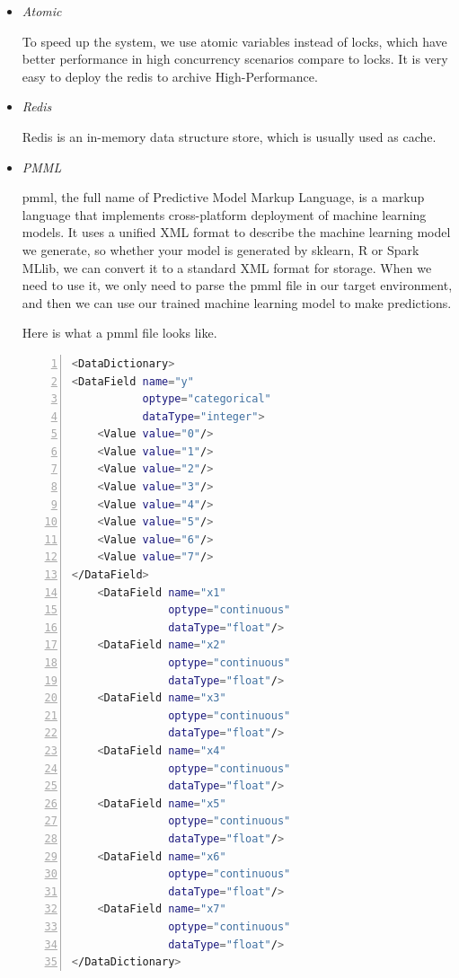 \documentclass[conference]{IEEEtran}
\begin{document}
\begin{itemize}
	\item \emph{Atomic}

	      To speed up the system, we use atomic variables instead of locks, which have better performance in high concurrency scenarios compare to locks.
	      It is very easy to deploy the redis to archive High-Performance.

	\item \emph{Redis}

	      Redis is an in-memory data structure store, which is usually used as cache.

	\item \emph{PMML}

	pmml, the full name of Predictive Model Markup Language, is a markup language that implements cross-platform deployment of machine learning models. It uses a unified XML format to describe the machine learning model we generate, so whether your model is generated by sklearn, R or Spark MLlib, we can convert it to a standard XML format for storage. When we need to use it, we only need to parse the pmml file in our target environment, and then we can use our trained machine learning model to make predictions.

	Here is what a pmml file looks like.
	      \begin{lstlisting}[language={bash},
		basicstyle=\small\menlo,
        numbers=left]
			<DataDictionary>
<DataField name="y" 
		   optype="categorical"
		   dataType="integer">
	<Value value="0"/>
	<Value value="1"/>
	<Value value="2"/>
	<Value value="3"/>
	<Value value="4"/>
	<Value value="5"/>
	<Value value="6"/>
	<Value value="7"/>
</DataField>
	<DataField name="x1"
               optype="continuous" 
               dataType="float"/>
	<DataField name="x2"
               optype="continuous" 
               dataType="float"/>
	<DataField name="x3"
               optype="continuous" 
               dataType="float"/>
	<DataField name="x4"
               optype="continuous" 
               dataType="float"/>
	<DataField name="x5"
               optype="continuous" 
               dataType="float"/>
	<DataField name="x6"
               optype="continuous" 
               dataType="float"/>
	<DataField name="x7"
               optype="continuous" 
               dataType="float"/>
</DataDictionary>
		  \end{lstlisting}


\end{itemize}
\end{document}
